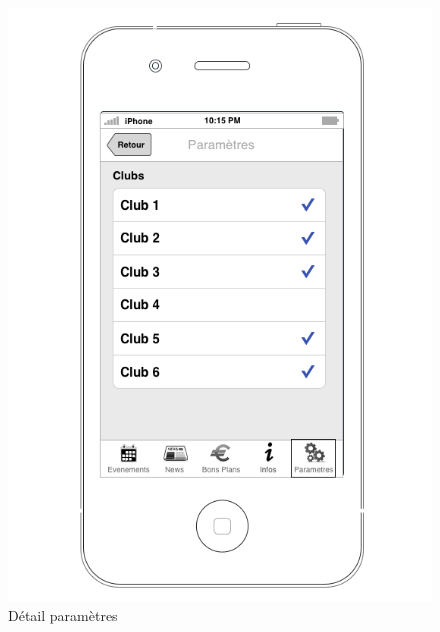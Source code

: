 \documentclass[a4paper, 11pt]{article}
\begin{document}
\begin{figure}[h!]
\begin{minipage}[c]{.33\linewidth}
\begin{center}
			\includegraphics[scale=0.29]{../../Sketch/iOS/parametres_detail.png}
		\end{center}
	\caption{Détail paramètres}
	\end{minipage}
\end{figure}
\end{document}
